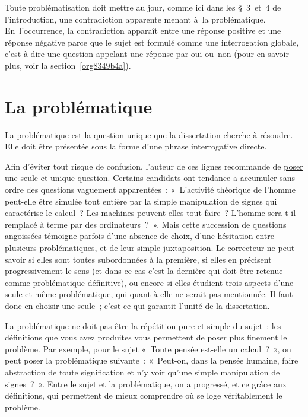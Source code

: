 \documentclass[a4paper,12pt]{report}
\begin{document}
Toute problématisation doit mettre au jour, comme ici dans les § 3 et 4
de l'introduction, une contradiction apparente menant à la
problématique. En l'occurrence, la contradiction apparaît entre une
réponse positive et une réponse négative parce que le sujet est formulé
comme une interrogation globale, c'est-à-dire une question appelant une
réponse par oui ou non (pour en savoir plus, voir la section \ref{org8349b4a}).


\section{La problématique}
\label{sec:org9e5eacd}

\uline{La problématique est la question unique que la dissertation cherche à
résoudre}. Elle doit être présentée sous la forme d'une phrase
interrogative directe.

Afin d'éviter tout risque de confusion, l'auteur de ces lignes
recommande de \uline{poser une seule et unique question}. Certains candidats
ont tendance a accumuler sans ordre des questions vaguement
apparentées : « L'activité théorique de l'homme peut-elle être simulée
tout entière par la simple manipulation de signes qui caractérise le
calcul ? Les machines peuvent-elles tout faire ? L'homme sera-t-il
remplacé à terme par des ordinateurs ? ». Mais cette succession de
questions angoissées témoigne parfois d'une absence de choix, d'une
hésitation entre plusieurs problématiques, et de leur simple
juxtaposition. Le correcteur ne peut savoir si elles sont toutes
subordonnées à la première, si elles en précisent progressivement le
sens (et dans ce cas c'est la dernière qui doit être retenue comme
problématique définitive), ou encore si elles étudient trois aspects
d'une seule et même problématique, qui quant à elle ne serait pas
mentionnée. Il faut donc en choisir une seule ; c'est ce qui garantit
l'unité de la dissertation.

\uline{La problématique ne doit pas être la répétition pure et simple du
sujet} : les définitions que vous avez produites vous permettent de
poser plus finement le problème. Par exemple, pour le sujet « Toute
pensée est-elle un calcul ? », on peut poser la problématique suivante :
« Peut-on, dans la pensée humaine, faire abstraction de toute
signification et n'y voir qu'une simple manipulation de signes ? ».
Entre le sujet et la problématique, on a progressé, et ce grâce aux
définitions, qui permettent de mieux comprendre où se loge véritablement
le problème.
\end{document}
